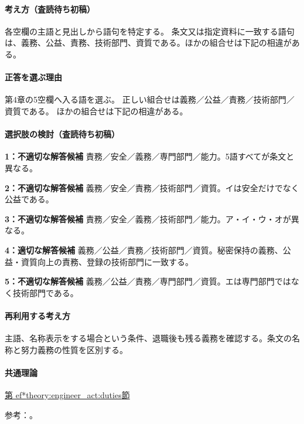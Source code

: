 \paragraph{考え方（査読待ち初稿）} 各空欄の主語と見出しから語句を特定する。 条文又は指定資料に一致する語句は、義務、公益、責務、技術部門、資質である。ほかの組合せは下記の相違がある。

\paragraph{正答を選ぶ理由} 第4章の5空欄へ入る語を選ぶ。 正しい組合せは義務／公益／責務／技術部門／資質である。 ほかの組合せは下記の相違がある。

\paragraph{選択肢の検討（査読待ち初稿）}

\noindent\textbf{1：不適切な解答候補} 責務／安全／義務／専門部門／能力。5語すべてが条文と異なる。\par

\noindent\textbf{2：不適切な解答候補} 義務／安全／責務／技術部門／資質。イは安全だけでなく公益である。\par

\noindent\textbf{3：不適切な解答候補} 責務／安全／義務／技術部門／能力。ア・イ・ウ・オが異なる。\par

\noindent\textbf{4：適切な解答候補} 義務／公益／責務／技術部門／資質。秘密保持の義務、公益・資質向上の責務、登録の技術部門に一致する。\par

\noindent\textbf{5：不適切な解答候補} 義務／公益／責務／専門部門／資質。エは専門部門ではなく技術部門である。\par

\paragraph{再利用する考え方} 主語、名称表示をする場合という条件、退職後も残る義務を確認する。条文の名称と努力義務の性質を区別する。

\paragraph{共通理論} \hyperref[theory:engineer_act:duties]{第
ef*{theory:engineer_act:duties}節}

\par 参考：\cite{engineer_act_current}。

